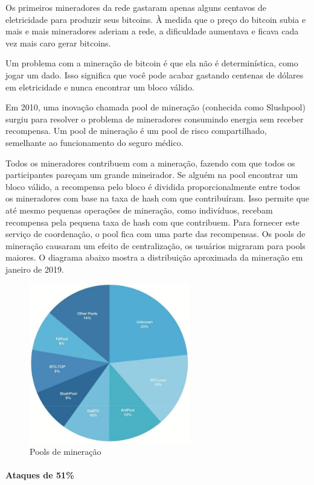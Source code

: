 Os primeiros mineradores da rede gastaram apenas alguns centavos de eletricidade para produzir seus bitcoins. À medida que o preço do bitcoin subia e mais e mais mineradores aderiam a rede, a dificuldade aumentava e ficava cada vez mais caro gerar bitcoins.

Um problema com a mineração de bitcoin é que ela não é determinística, como jogar um dado. Isso significa que você pode acabar gastando centenas de dólares em eletricidade e nunca encontrar um bloco válido.

Em 2010, uma inovação chamada pool de mineração (conhecida como Slushpool) surgiu para resolver o problema de mineradores consumindo energia sem receber recompensa. Um pool de mineração é um pool de risco compartilhado, semelhante ao funcionamento do seguro médico.

Todos os mineradores contribuem com a mineração, fazendo com que todos os participantes pareçam um grande mineirador. Se alguém na pool encontrar um bloco válido, a recompensa pelo bloco é dividida proporcionalmente entre todos os mineradores com base na taxa de hash com que contribuíram. Isso permite que até mesmo pequenas operações de mineração, como indivíduos, recebam recompensa pela pequena taxa de hash com que contribuem. Para fornecer este serviço de coordenação, o pool fica com uma parte das recompensas.
\newpage
Os pools de mineração causaram um efeito de centralização, os usuários migraram para pools maiores. O diagrama abaixo mostra a distribuição aproximada da mineração em janeiro de 2019.

\begin{figure}
  \centering
  \includegraphics[width=7cm]{imagens/capitulo-9-pizza.jpg}
  \caption{Pools de mineração}
\end{figure}

\paragraph{Ataques de 51\%}
